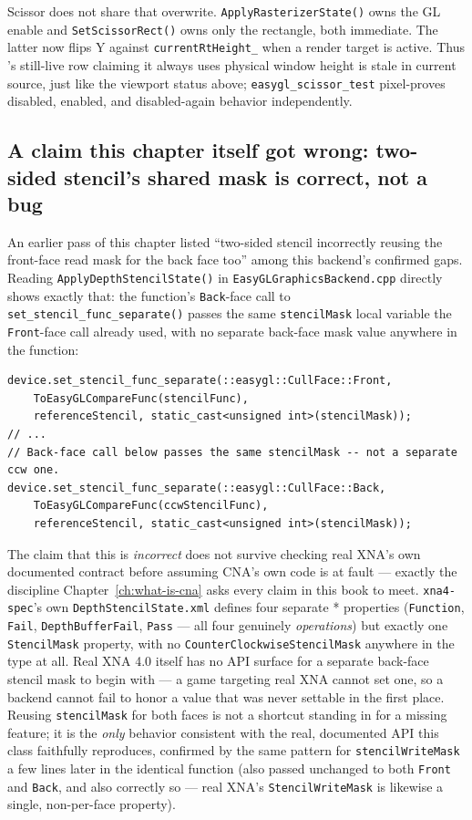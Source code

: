 Scissor does not share that overwrite. \texttt{ApplyRasterizerState()} owns the GL enable and
\texttt{SetScissorRect()} owns only the rectangle, both immediate. The latter now flips Y
against \texttt{currentRtHeight\_} when a render target is active. Thus
's still-live row claiming it always uses physical window height is
stale in current source, just like the viewport status above; \texttt{easygl\_scissor\_test}
pixel-proves disabled, enabled, and disabled-again behavior independently.

\subsection{A claim this chapter itself got wrong: two-sided stencil's shared mask is correct, not a bug}

An earlier pass of this chapter listed ``two-sided stencil incorrectly reusing the front-face
read mask for the back face too'' among this backend's confirmed gaps. Reading
\texttt{ApplyDepthStencilState()} in \texttt{EasyGLGraphicsBackend.cpp} directly shows exactly
that: the function's \texttt{Back}-face call to
\texttt{set\_stencil\_func\_separate()} passes the same \texttt{stencilMask} local
variable the \texttt{Front}-face call already used, with no separate
back-face mask value anywhere in the function:

\begin{lstlisting}
device.set_stencil_func_separate(::easygl::CullFace::Front,
    ToEasyGLCompareFunc(stencilFunc),
    referenceStencil, static_cast<unsigned int>(stencilMask));
// ...
// Back-face call below passes the same stencilMask -- not a separate ccw one.
device.set_stencil_func_separate(::easygl::CullFace::Back,
    ToEasyGLCompareFunc(ccwStencilFunc),
    referenceStencil, static_cast<unsigned int>(stencilMask));
\end{lstlisting}

The claim that this is \emph{incorrect} does not survive checking real XNA's own documented
contract before assuming CNA's own code is at fault --- exactly the discipline
Chapter~\ref{ch:what-is-cna} asks every claim in this book to meet. \texttt{xna4-spec}'s own
\texttt{DepthStencilState.xml} defines four separate *
properties (\texttt{Function}, \texttt{Fail}, \texttt{DepthBufferFail}, \texttt{Pass} --- all
four genuinely \emph{operations}) but exactly one \texttt{StencilMask} property, with no
\texttt{CounterClockwiseStencilMask} anywhere in the type at all. Real XNA 4.0 itself has no API
surface for a separate back-face stencil mask to begin with --- a game targeting real XNA cannot
set one, so a backend cannot fail to honor a value that was never settable in the first place.
Reusing \texttt{stencilMask} for both faces is not a shortcut standing in for a missing feature;
it is the \emph{only} behavior consistent with the real, documented API this class faithfully
reproduces, confirmed by the same pattern for \texttt{stencilWriteMask} a few lines later in the
identical function (also passed unchanged to both \texttt{Front} and \texttt{Back}, and also
correctly so --- real XNA's \texttt{StencilWriteMask} is likewise a single, non-per-face
property).

